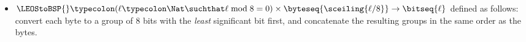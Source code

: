 \begin{itemize}
        defined as follows: pad the input on the right with $8 \mult \ceiling{\ell/8} - \ell$ zero bits
        so that its length is a multiple of 8 bits. Then convert each group of 8 bits to a byte
        value with the \emph{least} significant bit first, and concatenate the resulting bytes
        in the same order as the groups.
  \item $\LEOStoBSP{} \typecolon (\ell \typecolon \Nat \suchthat \ell \bmod 8 = 0) \times \byteseq{\sceiling{\ell/8}} \rightarrow \bitseq{\ell}$
        defined as follows: convert each byte to a group of 8 bits with the \emph{least} significant
        bit first, and concatenate the resulting groups in the same order as the bytes.
\end{itemize}
